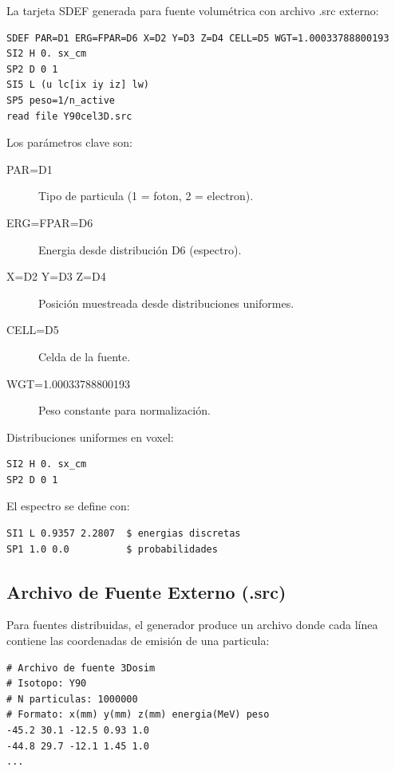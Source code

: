 \documentclass[12pt,a4paper]{article}
\begin{document}
La tarjeta SDEF generada para fuente volumétrica con archivo .src externo:

\begin{lstlisting}
SDEF PAR=D1 ERG=FPAR=D6 X=D2 Y=D3 Z=D4 CELL=D5 WGT=1.00033788800193
SI2 H 0. sx_cm
SP2 D 0 1
SI5 L (u lc[ix iy iz] lw)
SP5 peso=1/n_active
read file Y90cel3D.src
\end{lstlisting}


Los parámetros clave son:

\begin{description}
    \item[PAR=D1] Tipo de particula (1 = foton, 2 = electron).
    \item[ERG=FPAR=D6] Energia desde distribución D6 (espectro).
    \item[X=D2 Y=D3 Z=D4] Posición muestreada desde distribuciones uniformes.
    \item[CELL=D5] Celda de la fuente.
    \item[WGT=1.00033788800193] Peso constante para normalización.
\end{description}

Distribuciones uniformes en voxel:

\begin{lstlisting}
SI2 H 0. sx_cm
SP2 D 0 1
\end{lstlisting}

El espectro se define con:

\begin{lstlisting}
SI1 L 0.9357 2.2807  $ energias discretas
SP1 1.0 0.0          $ probabilidades
\end{lstlisting}

\subsection{Archivo de Fuente Externo (.src)}

Para fuentes distribuidas, el generador produce un archivo donde cada línea contiene las coordenadas de emisión de una particula:

\begin{lstlisting}
# Archivo de fuente 3Dosim
# Isotopo: Y90
# N particulas: 1000000
# Formato: x(mm) y(mm) z(mm) energia(MeV) peso
-45.2 30.1 -12.5 0.93 1.0
-44.8 29.7 -12.1 1.45 1.0
...
\end{lstlisting}
\end{document}
